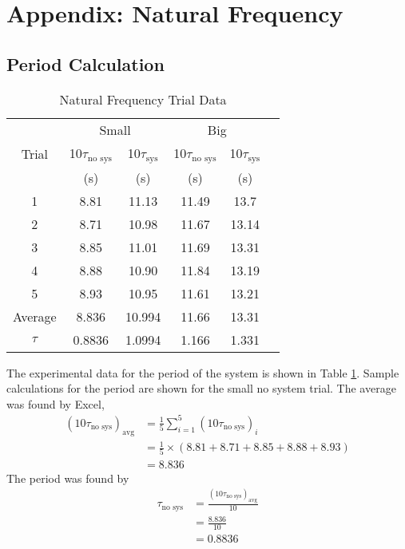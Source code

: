 \section{Appendix: Natural Frequency}
\label{app:Natural Frequency Derivation}
\subsection{Period Calculation}
\begin{table}[H]
    \centering
    \caption{Natural Frequency Trial Data}
    \label{tab:natural_frequency}
    \begin{tabular}{cccccc}
    \toprule
        & \multicolumn{2}{c}{Small} & \multicolumn{2}{c}{Big} \\
        \cmidrule(lr){2-3} \cmidrule(lr){4-5}
        Trial & 10$\tau_{\text{no sys}}$ & 10$\tau_{\text{sys}}$ & 10$\tau_{\text{no sys}}$ & 10$\tau_{\text{sys}}$ \\
        & (s) & (s) & (s) & (s) \\
        \midrule
        1 & 8.81 & 11.13 & 11.49 & 13.7 \\
        2 & 8.71 & 10.98 & 11.67 & 13.14 \\
        3 & 8.85 & 11.01 & 11.69 & 13.31 \\
        4 & 8.88 & 10.90 & 11.84 & 13.19 \\
        5 & 8.93 & 10.95 & 11.61 & 13.21 \\
        \midrule
        \midrule
        Average & 8.836 & 10.994 & 11.66 & 13.31 \\
        $\tau$ & 0.8836 & 1.0994 & 1.166 & 1.331 \\
        \bottomrule
    \end{tabular}
\end{table}
The experimental data for the period of the system is shown in Table \ref{tab:natural_frequency}. Sample calculations for the period are shown for the small no system trial. The average was found by Excel,
\begin{align*}
    (10\tau_{\text{no sys}})_{\text{avg}} &= \frac{1}{5} \sum_{i=1}^{5} (10\tau_{\text{no sys}})_i \\
    &= \frac{1}{5} \times (8.81 + 8.71 + 8.85 + 8.88 + 8.93) \\
    &= 8.836
\end{align*}
The period was found by
\begin{align*}
    \tau_{\text{no sys}} &= \frac{(10\tau_{\text{no sys}})_{\text{avg}}}{10} \\
    &= \frac{8.836}{10} \\
    &= \boxed{0.8836}
\end{align*}

